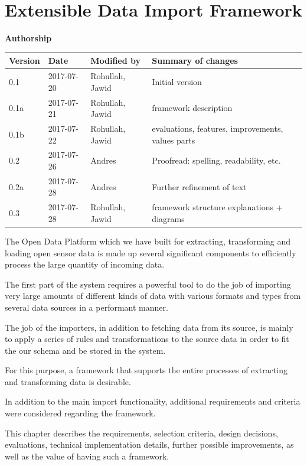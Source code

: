 \section{Extensible Data Import Framework}\label{sec:import-framework}

\textbf{Authorship}
\vspace*{4mm}

\begin{longtable}{@{}llll@{}}
\toprule
Version & Date & Modified by & Summary of changes \\
\midrule
\endhead
0.1 & 2017-07-20 & Rohullah, Jawid & Initial version \\
0.1a & 2017-07-21 & Rohullah, Jawid & framework description \\
0.1b & 2017-07-22 & Rohullah, Jawid & evaluations, features, improvements, values parts \\
0.2 & 2017-07-26 & Andres & Proofread: spelling, readability, etc. \\
0.2a & 2017-07-28 & Andres & Further refinement of text \\
0.3 & 2017-07-28 & Rohullah, Jawid & framework structure explanations + diagrams \\
\bottomrule
\end{longtable}

\vspace*{4mm}

The Open Data Platform which we have built for extracting, transforming
and loading open sensor data is made up several significant components
to efficiently process the large quantity of incoming data.

The first part of the system requires a powerful tool to do the job of
importing very large amounts of different kinds of data with various
formats and types from several data sources in a performant manner.

The job of the importers, in addition to fetching data from its source,
is mainly to apply a series of rules and transformations to the source
data in order to fit the our schema and be stored in the system.

For this purpose, a framework that supports the entire processes of
extracting and transforming data is desirable.

In addition to the main import functionality, additional requirements
and criteria were considered regarding the framework.

This chapter describes the requirements, selection criteria, design
decisions, evaluations, technical implementation details, further
possible improvements, as well as the value of having such a framework.

